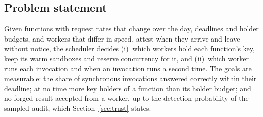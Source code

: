 \subsection{Problem statement}
\label{sec:bg-problem}

Given functions with request rates that change over the day, deadlines and holder budgets, and workers that differ in
speed, attest when they arrive and leave without notice, the scheduler decides (i)~which workers hold each function's
key, keep its warm sandboxes and reserve concurrency for it, and (ii)~which worker runs each invocation and when an
invocation runs a second time. The goals are measurable: the share of synchronous invocations answered correctly
within their deadline; at no time more key holders of a function than its holder budget; and no forged result
accepted from a worker, up to the detection probability of the sampled audit, which Section~\ref{sec:trust} states.

